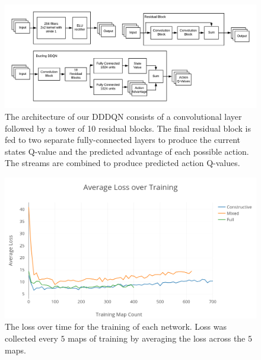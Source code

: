 \documentclass[letterpaper]{article} %
\begin{document}
\begin{figure}[tb]
\begin{center}
\includegraphics[width=1.0\linewidth]{graphics/network-diagram.png}
\caption{The architecture of our DDDQN consists of a convolutional layer followed by a tower of 10 residual blocks. The final residual block is fed to two separate fully-connected layers to produce the current states Q-value and the predicted advantage of each possible action. The streams are combined to produce predicted action Q-values.}
\label{fig:network-diagram}
\end{center}
\end{figure}

\begin{figure}[!htb]
\begin{center}
\includegraphics[width=1.0\linewidth]{graphics/loss-scores.png}
\caption{The loss over time for the training of each network. Loss was collected every $5$ maps of training by averaging the loss across the $5$ maps.}
\label{fig:loss-results}
\end{center}
\end{figure}
\end{document}
